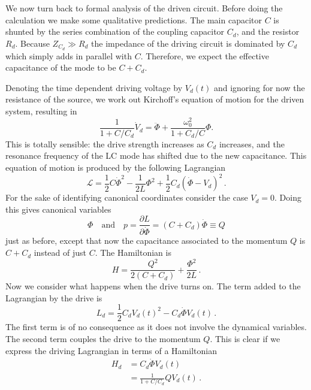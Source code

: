 We now turn back to formal analysis of the driven circuit.
Before doing the calculation we make some qualitative predictions.
The main capacitor $C$ is shunted by the series combination of the coupling capacitor $C_d$, and the resistor $R_d$.
Because  $Z_{C_d} \gg R_d$ the impedance of the driving circuit is dominated by $C_d$ which simply adds in parallel with $C$.
Therefore, we expect the effective capacitance of the mode to be $C+C_d$.

Denoting the time dependent driving voltage by $V_d(t)$ and ignoring for now the resistance of the source, we work out Kirchoff's equation of motion for the driven system, resulting in \begin{equation}
\frac{1}{1+C/C_d} \dot{V}_d = \ddot{\Phi} + \frac{\omega_0^2}{1 + C_d/C} \Phi. \end{equation}
This is totally sensible: the drive strength increases as $C_d$ increases, and the resonance frequency of the LC mode has shifted due to the new capacitance.
This equation of motion is produced by the following Lagrangian
\begin{equation}
\mathcal{L} = \frac{1}{2}C \dot{\Phi}^2 - \frac{1}{2L}\Phi^2 + \frac{1}{2} C_d \left( \dot{\Phi} - V_d \right)^2 \, .
\end{equation}
For the sake of identifying canonical coordinates consider the case $V_d=0$. Doing this gives canonical variables \begin{equation}
\Phi \quad \textrm{and} \quad p = \frac{\partial L}{\partial \dot{\Phi}} = \left( C + C_d \right) \dot{\Phi} \equiv Q \end{equation}
just as before, except that now the capacitance associated to the momentum $Q$ is $C+C_d$ instead of just $C$.
The Hamiltonian is
\begin{equation}
H = \frac{Q^2}{2 (C + C_d)} + \frac{\Phi^2}{2L} \, .
\end{equation}
Now we consider what happens when the drive turns on.
The term added to the Lagrangian by the drive is
\begin{equation}
L_d = \frac{1}{2}C_d V_d(t)^2 - C_d \dot{\Phi} V_d(t) \, .
\end{equation}
The first term is of no consequence as it does not involve the dynamical variables.
The second term couples the drive to the momentum $Q$.
This is clear if we express the driving Lagrangian in terms of a Hamiltonian
\begin{align}
H_d &= C_d \dot{\Phi}V_d(t) \\
&= \frac{1}{1+C/C_d} Q V_d(t) \, . \label{eq:sec:driving:H_dVsCircuitParams}
\end{align}

